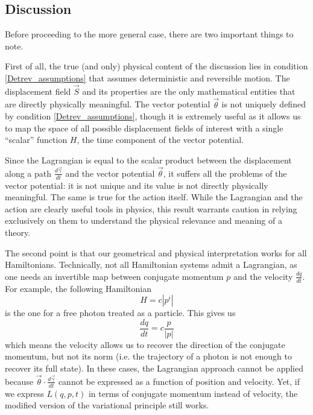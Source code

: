 \documentclass[10pt,twocolumn, nofootinbib]{revtex4-2}
\begin{document}
\subsection{Discussion}

Before proceeding to the more general case, there are two important things to note.

First of all, the true (and only) physical content of the discussion lies in condition \ref{Detrev_assumptions} that assumes deterministic and reversible motion. The displacement field $\vec{S}$ and its properties are the only mathematical entities that are directly physically meaningful. The vector potential $\vec{\theta}$ is not uniquely defined by condition \ref{Detrev_assumptions}, though it is extremely useful as it allows us to map the space of all possible displacement fields of interest with a single ``scalar'' function $H$, the time component of the vector potential.

Since the Lagrangian is equal to the scalar product between the displacement along a path $\frac{d\vec{\gamma}}{dt}$ and the vector potential $\vec{\theta}$, it suffers all the problems of the vector potential: it is not unique and its value is not directly physically meaningful. The same is true for the action itself. While the Lagrangian and the action are clearly useful tools in physics, this result warrants caution in relying exclusively on them to understand the physical relevance and meaning of a theory.

The second point is that our geometrical and physical interpretation works for all Hamiltonians. Technically, not all Hamiltonian systems admit a Lagrangian, as one needs an invertible map between conjugate momentum $p$ and the velocity $\frac{dq}{dt}$. For example, the following Hamiltonian
\begin{equation}
	H = c |p^i|
\end{equation}
is the one for a free photon treated as a particle. This gives us
\begin{equation}
	\frac{dq}{dt}= c \frac{p}{|p|}
\end{equation}
which means the velocity allows us to recover the direction of the conjugate momentum, but not its norm (i.e. the trajectory of a photon is not enough to recover its full state). In these cases, the Lagrangian approach cannot be applied because $\vec{\theta} \cdot \frac{d\vec{\gamma}}{dt}$ cannot be expressed as a function of position and velocity. Yet, if we express $L(q,p,t)$ in terms of conjugate momentum instead of velocity, the modified version of the variational principle still works.
\end{document}
